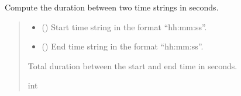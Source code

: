\documentclass[letterpaper,10pt,english]{sphinxmanual}
\begin{document}
\begin{fulllineitems}
\label{\detokenize{frise:frise.ecriture_fichier.compute_duration}}
\pysigstartsignatures
{}
\pysigstopsignatures
\sphinxAtStartPar
Compute the duration between two time strings in seconds.
\begin{quote}\begin{description}
\begin{itemize}
\item {} 
\sphinxAtStartPar
{} () \textendash{} Start time string in the format “hh:mm:ss”.

\item {} 
\sphinxAtStartPar
{} () \textendash{} End time string in the format “hh:mm:ss”.

\end{itemize}

\sphinxAtStartPar
Total duration between the start and end time in seconds.

\sphinxAtStartPar
int

\end{description}\end{quote}

\end{fulllineitems}

\end{document}
